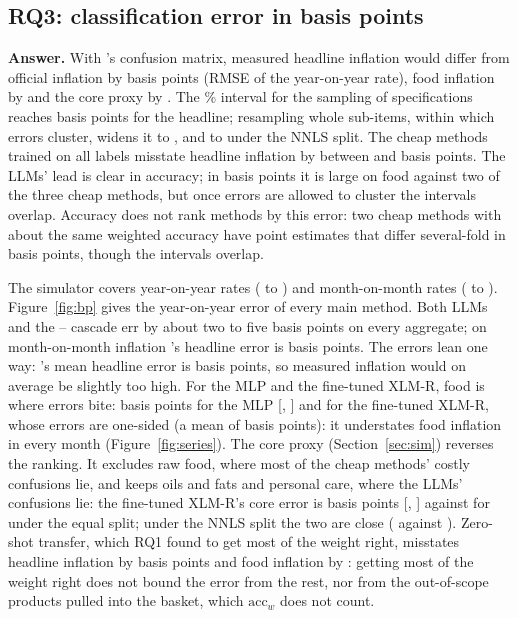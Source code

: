 \subsection{RQ3: classification error in basis points}\label{sec:rq3}

\textbf{Answer.} With \NameOpus's confusion matrix, measured headline inflation would differ
from official inflation by \BpYoyRmseHeadlineOpus{} basis points (RMSE of the year-on-year
rate), food inflation by \BpYoyRmseFoodOpus{} and the core proxy by \BpYoyRmseCoreOpus. The
\CfgCI\% interval for the sampling of specifications reaches \BpYoyRmseHeadlineOpusHi{} basis
points for the headline; resampling whole sub-items, within which errors cluster, widens it to
\BpYoyRmseHeadlineOpusClusterHi, and to \BpYoyRmseHeadlineOpusClusterNnlsHi{} under the NNLS
split. The cheap methods trained on all labels misstate headline inflation by between
\BpYoyRmseHeadlineBgeMLP{} and \BpYoyRmseHeadlineEfiveMLP{} basis points. The LLMs' lead is
clear in accuracy; in basis points it is large on food against two of the three cheap
methods, but once errors are allowed to cluster the intervals overlap. Accuracy does not rank methods by
this error: two cheap methods with about the same weighted accuracy have point estimates that
differ several-fold in basis points, though the intervals overlap.

The simulator covers \NMonthsYoy{} year-on-year rates (\SimFirstYoy{} to \SimLastYoy) and
\NMonthsMom{} month-on-month rates (\SimFirstMom{} to \SimLastMom). Figure~\ref{fig:bp} gives
the year-on-year error of every main method. Both LLMs and the \NameEfive{}--\NameOpus{}
cascade err by about two to five basis points on every aggregate; on month-on-month
inflation \NameOpus's headline error is \BpMomRmseHeadlineOpus{} basis points. The errors lean
one way: \NameOpus's mean headline error is \BpYoyMeanHeadlineOpus{} basis points, so measured
inflation would on average be slightly too high. For the \NameEfive{} MLP and the fine-tuned
XLM-R, food is where errors bite: \BpYoyRmseFoodEfiveMLP{} basis points for
the \NameEfive{} MLP [\BpYoyRmseFoodEfiveMLPLo, \BpYoyRmseFoodEfiveMLPHi] and
\BpYoyRmseFoodXlmrFT{} for the fine-tuned XLM-R, whose errors are one-sided (a mean of
\BpYoyMeanFoodXlmrFT{} basis points): it understates food inflation in every month
(Figure~\ref{fig:series}). The core proxy (Section~\ref{sec:sim}) reverses the ranking. It excludes raw food, where
most of the cheap methods' costly confusions lie, and keeps oils and fats and personal care,
where the LLMs' confusions lie: the fine-tuned XLM-R's core error is \BpYoyRmseCoreXlmrFT{} basis points
[\BpYoyRmseCoreXlmrFTLo, \BpYoyRmseCoreXlmrFTHi] against \BpYoyRmseCoreOpus{} for \NameOpus{}
under the equal split; under the NNLS split the two are close (\BpYoyRmseCoreXlmrFTNnls{}
against \BpYoyRmseCoreOpusNnls). Zero-shot transfer, which RQ1 found to get most of the weight
right, misstates headline inflation by \BpYoyRmseHeadlineEfiveMLPZeroShot{} basis points and
food inflation by \BpYoyRmseFoodEfiveMLPZeroShot{}: getting most of the weight right does not
bound the error from the rest, nor from the out-of-scope products pulled into the basket,
which $\mathrm{acc}_w$ does not count.

